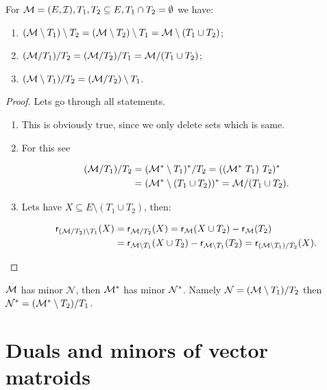 \begin{claim}
	For $\mathcal{M} = (E, \mathcal{I}), T_1, T_2 \subseteq E, T_1 \cap T_2 = \emptyset$ we have:
	
	\begin{enumerate}
		\item $(\mathcal{M} \setminus T_1) \setminus T_2 = (\mathcal{M} \setminus T_2) \setminus T_1 = \mathcal{M} \setminus (T_1 \cup T_2)$;
		\item $(\mathcal{M} / T_1) / T_2 = (\mathcal{M} / T_2) / T_1 = \mathcal{M} / (T_1 \cup T_2)$;
		\item $(\mathcal{M} \setminus T_1) / T_2 = (\mathcal{M} / T_2) \setminus T_1$.
	\end{enumerate}
\end{claim}

\begin{proof}
	Lets go through all statements.
	
	\begin{enumerate}
		\item This is obviously true, since we only delete sets which is same.
		\item For this see
		
		$$
		\begin{aligned}
			(\mathcal{M} / T_1) / T_2 &= (\mathcal{M}^{\ast} \setminus T_1)^{\ast} / T_2 = ((\mathcal{M}^{\ast} \ T_1) \ T_2)^{\ast}\\
			&= (\mathcal{M}^{\ast} \setminus (T_1 \cup T_2))^{\ast} = \mathcal{M} / (T_1 \cup T_2).
		\end{aligned}
		$$
		
		\item Lets have $X \subseteq E \setminus (T_1 \cup T_2)$, then:
		
		$$
		\begin{aligned}
			\operatorname{\textsf{r}}_{(\mathcal{M} / T_2) \setminus T_1} (X) &= \operatorname{\textsf{r}}_{\mathcal{M} / T_2}(X) = \operatorname{\textsf{r}}_{\mathcal{M}} (X \cup T_2) - \operatorname{\textsf{r}}_{\mathcal{M}}(T_2)\\
			&= \operatorname{\textsf{r}}_{\mathcal{M} \setminus T_1} (X \cup T_2) - \operatorname{\textsf{r}}_{\mathcal{M} \setminus T_1} (T_2) = \operatorname{\textsf{r}}_{(\mathcal{M} \setminus T_1) / T_2} (X).
		\end{aligned}
		$$
	\end{enumerate}
\end{proof}

\begin{cor}
	$\mathcal{M}$ has minor $\mathcal{N}$, then $\mathcal{M}^{\ast}$ has minor $\mathcal{N}^{\ast}$. Namely $\mathcal{N} = (\mathcal{M} \setminus T_1) / T_2$ then $\mathcal{N}^{\ast} = (\mathcal{M}^{\ast} \setminus T_2) / T_1$.
\end{cor}

\section{Duals and minors of vector matroids}

